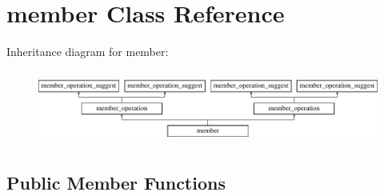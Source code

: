 \hypertarget{classmember}{\section{member Class Reference}
\label{classmember}
}
Inheritance diagram for member\-:\begin{figure}[H]
\begin{center}
\leavevmode
\includegraphics[height=2.413793cm]{classmember}
\end{center}
\end{figure}
\subsection*{Public Member Functions}

